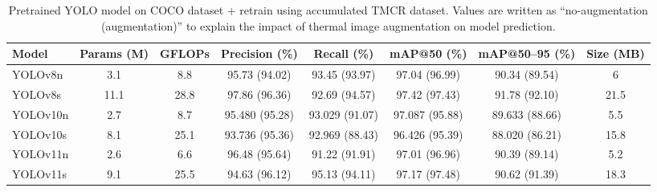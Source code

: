 \documentclass[journal,twoside,web]{ieeecolor}
\begin{document}
\begin{table}[t]
\centering
\caption{{Pretrained YOLO model on COCO dataset + retrain using accumulated TMCR dataset. Values are written as ``no-augmentation (augmentation)'' to explain the impact of thermal image augmentation on model prediction.}}
\label{tab:merged_yolo_comparison_transfer}
\small
\renewcommand{\arraystretch}{1.15}
\begin{tabular}{l c c c c c c c}
\toprule
{\textbf{Model}} & {\textbf{Params (M)}} & {\textbf{GFLOPs}} &
{\textbf{Precision (\%)}} & {\textbf{Recall (\%)}} & {\textbf{mAP@50 (\%)}} &
{\textbf{mAP@50--95 (\%)}} & {\textbf{Size (MB)} }\\
\midrule

{YOLOv8n}  & {3.1}  & {8.8}  &
{95.73 (94.02)} & {93.45 (93.97)} & {97.04 (96.99)} & {90.34 (89.54)} & {6} \\

{YOLOv8s}  & {11.1}  & {28.8 } &
{97.86 (96.36) }& {92.69 (94.57) }&{ 97.42 (97.43)} & {91.78 (92.10)} &{ 21.5 }\\

{YOLOv10n}  & {2.7}  & {8.7}  &
{95.480 (95.28) }&{ 93.029 (91.07)} & {97.087 (95.88)} &{ 89.633 (88.66)} & {5.5} \\

{YOLOv10s}  & {8.1}  & {25.1}  &
{93.736 (95.36)} & {92.969 (88.43)} & {96.426 (95.39)} & {88.020 (86.21)} & {15.8} \\

{YOLOv11n}  & {2.6}  & {6.6}  &
{96.48 (95.64)} & {91.22 (91.91)} & {97.01 (96.96)} & {90.39 (89.14)} & {5.2} \\

{YOLOv11s}  & {9.1}  & {25.5}  &
{94.63 (96.12)} & {95.13 (94.11)} & {97.17 (97.48)} & {90.62 (91.39)} & {18.3} \\

\bottomrule
\end{tabular}
\end{table}
\end{document}
